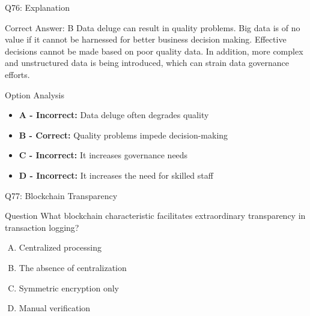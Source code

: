 \documentclass{beamer}
\begin{document}
	\begin{frame}{Q76: Explanation}
		\begin{block}{Correct Answer: B}
			Data deluge can result in quality problems. Big data is of no value if it cannot be harnessed for better business decision making. Effective decisions cannot be made based on poor quality data. In addition, more complex and unstructured data is being introduced, which can strain data governance efforts.
		\end{block}
		\begin{block}{Option Analysis}
			\begin{itemize}
				\item \textbf{A - Incorrect:} Data deluge often degrades quality
				\item \textbf{B - Correct:} Quality problems impede decision-making
				\item \textbf{C - Incorrect:} It increases governance needs
				\item \textbf{D - Incorrect:} It increases the need for skilled staff
			\end{itemize}
		\end{block}
	\end{frame}
	
	\begin{frame}{Q77: Blockchain Transparency}
		\begin{block}{Question}
			What blockchain characteristic facilitates extraordinary transparency in transaction logging?
		\end{block}
		\begin{enumerate}[(A)]
			\item Centralized processing
			\item The absence of centralization
			\item Symmetric encryption only
			\item Manual verification
		\end{enumerate}
	\end{frame}
	
\end{document}
